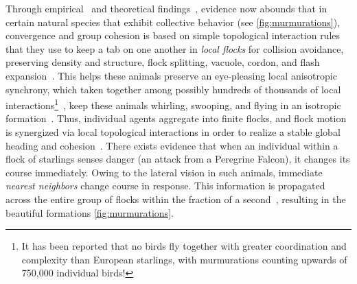 Through empirical~\cite{Ballerini1232, Helbing20, VicsekPhaseNovel} %
and theoretical findings~\cite{JadbabaieCoord}, evidence now abounds that in certain natural species that exhibit collective behavior (see \autoref{fig:murmurations}), convergence and group cohesion is based on simple topological interaction rules that they use to keep a tab on one another in \textit{local flocks} for collision avoidance, preserving density and structure, flock splitting, vacuole, cordon, and flash expansion~\cite{NatGeo}. This helps these animals preserve an eye-pleasing local anisotropic synchrony, which taken together among possibly hundreds of thousands of local interactions\footnote{It has been reported that no birds fly together with greater coordination and complexity than European starlings,  with murmurations counting upwards of 750,000 individual birds!}~\cite{NatGeo}, keep these animals whirling, swooping, and flying in an isotropic formation~\cite{Ballerini1232}. Thus, individual agents aggregate into finite flocks, and flock motion is synergized via local topological interactions in order to realize a stable global heading and cohesion~\cite{JadbabaieCoord}. There exists evidence that when an individual within a flock of starlings senses danger (\eg an attack from a Peregrine Falcon), it changes its course immediately. Owing to the lateral vision in such animals, immediate \textit{nearest neighbors} change course in response. This information is propagated across the entire group of flocks within the fraction of a second~\cite{Ballerini1232}, resulting in the beautiful formations \cf \autoref{fig:murmurations}. 


